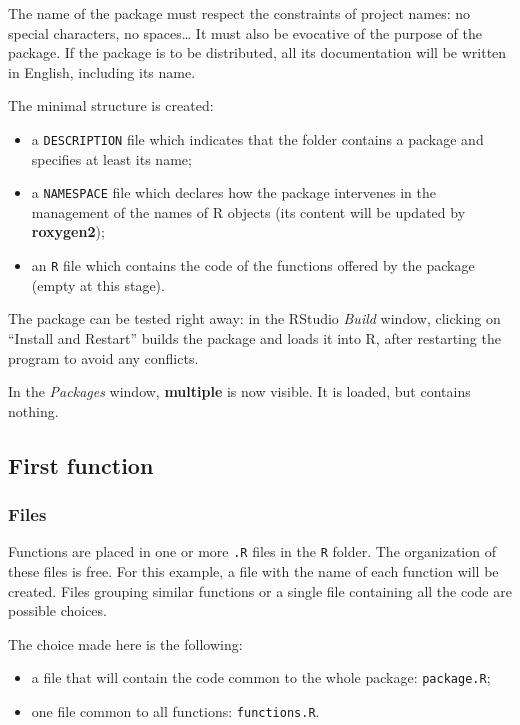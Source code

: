 \documentclass[
  12pt,
  american,
  a4paper,
  extrafontsizes,onecolumn,openright
  ]{memoir}
\providecommand{\tightlist}{%
  \setlength{\itemsep}{0pt}\setlength{\parskip}{0pt}}
\begin{document}
The name of the package must respect the constraints of project names: no special characters, no spaces\ldots{}
It must also be evocative of the purpose of the package.
If the package is to be distributed, all its documentation will be written in English, including its name.

The minimal structure is created:

\begin{itemize}
\tightlist
\item
  a \texttt{DESCRIPTION} file which indicates that the folder contains a package and specifies at least its name;
\item
  a \texttt{NAMESPACE} file which declares how the package intervenes in the management of the names of R objects (its content will be updated by \textbf{roxygen2});
\item
  an \texttt{R} file which contains the code of the functions offered by the package (empty at this stage).
\end{itemize}

The package can be tested right away: in the RStudio \emph{Build} window, clicking on \enquote{Install and Restart} builds the package and loads it into R, after restarting the program to avoid any conflicts.

In the \emph{Packages} window, \textbf{multiple} is now visible.
It is loaded, but contains nothing.

\hypertarget{first-function}{%
\subsection{First function}\label{first-function}}

\hypertarget{files}{%
\subsubsection{Files}\label{files}}

Functions are placed in one or more \texttt{.R} files in the \texttt{R} folder.
The organization of these files is free.
For this example, a file with the name of each function will be created.
Files grouping similar functions or a single file containing all the code are possible choices.

The choice made here is the following:

\begin{itemize}
\tightlist
\item
  a file that will contain the code common to the whole package: \texttt{package.R};
\item
  one file common to all functions: \texttt{functions.R}.
\end{itemize}
\end{document}
